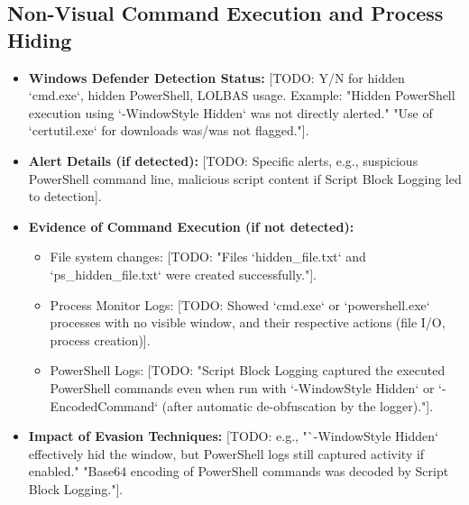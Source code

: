 \documentclass[11pt]{article}
\begin{document}
	\subsection{Non-Visual Command Execution and Process Hiding}
	\begin{itemize}
		\item \textbf{Windows Defender Detection Status:} [TODO: Y/N for hidden `cmd.exe`, hidden PowerShell, LOLBAS usage. Example: "Hidden PowerShell execution using `-WindowStyle Hidden` was not directly alerted." "Use of `certutil.exe` for downloads was/was not flagged."].
		\item \textbf{Alert Details (if detected):} [TODO: Specific alerts, e.g., suspicious PowerShell command line, malicious script content if Script Block Logging led to detection].
		\item \textbf{Evidence of Command Execution (if not detected):}
		\begin{itemize}
			\item File system changes: [TODO: "Files `hidden_file.txt` and `ps_hidden_file.txt` were created successfully."].
			\item Process Monitor Logs: [TODO: Showed `cmd.exe` or `powershell.exe` processes with no visible window, and their respective actions (file I/O, process creation)].
			\item PowerShell Logs: [TODO: "Script Block Logging captured the executed PowerShell commands even when run with `-WindowStyle Hidden` or `-EncodedCommand` (after automatic de-obfuscation by the logger)."].
		\end{itemize}
		\item \textbf{Impact of Evasion Techniques:} [TODO: e.g., "`-WindowStyle Hidden` effectively hid the window, but PowerShell logs still captured activity if enabled." "Base64 encoding of PowerShell commands was decoded by Script Block Logging."].
	\end{itemize}
	
\end{document}
